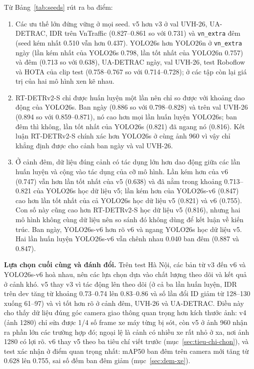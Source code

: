 Từ Bảng~\ref{tab:seeds} rút ra ba điểm:
\begin{enumerate}
  \item Các ưu thế lớn đứng vững ở mọi seed. v5 hơn v3 ở val UVH-26, UA-DETRAC, IDR trên VnTraffic (0.827--0.861 so với
        0.731) và \texttt{vn\_extra} đêm (seed kém nhất 0.510 vẫn hơn 0.437). YOLO26s hơn YOLO26n ở \texttt{vn\_extra}
        ngày (lần kém nhất của YOLO26s 0.798, lần tốt nhất của YOLO26n 0.757) và đêm (0.713 so với 0.638), UA-DETRAC
        ngày, val UVH-26, test Roboflow và HOTA của clip test (0.758--0.767 so với 0.714--0.728); ở các tập còn lại giá
        trị của hai mô hình xen kẽ nhau.
  \item RT-DETRv2-S chỉ được huấn luyện một lần nên chỉ so được với khoảng dao động của YOLO26s. Ban ngày (0.886 so với
        0.798--0.828) và trên val UVH-26 (0.894 so với 0.859--0.871), nó cao hơn mọi lần huấn luyện YOLO26s; ban đêm thì
        không, lần tốt nhất của YOLO26s (0.821) đã ngang nó (0.816). Kết luận RT-DETRv2-S chính xác hơn YOLO26s ở cùng
        ảnh 960 vì vậy chỉ khẳng định được cho cảnh ban ngày và val UVH-26.
  \item Ở cảnh đêm, dữ liệu đúng cảnh có tác dụng lớn hơn dao động giữa các lần huấn luyện và cộng vào tác dụng của cỡ
        mô hình. Lần kém hơn của v6 (0.747) vẫn hơn lần tốt nhất của v5 (0.638) và đã nằm trong khoảng 0.713--0.821 của
        YOLO26s học dữ liệu v5; lần kém hơn của YOLO26s-v6 (0.847) cao hơn lần tốt nhất của cả YOLO26s học dữ liệu v5
        (0.821) và v6 (0.755). Con số này cũng cao hơn RT-DETRv2-S học dữ liệu v5 (0.816), nhưng hai mô hình không cùng
        dữ liệu nên so sánh đó không dùng để kết luận về kiến trúc. Ban ngày, YOLO26s-v6 hơn rõ v6 và ngang YOLO26s học
        dữ liệu v5. Hai lần huấn luyện YOLO26s-v6 vẫn chênh nhau 0.040 ban đêm (0.887 và 0.847).
\end{enumerate}

\textbf{Lựa chọn cuối cùng và đánh đổi.} Trên test Hà Nội, các bản từ v3 đến v6 và YOLO26s-v6 hoà nhau, nên các lựa
chọn dựa vào chất lượng theo dõi và kết quả ở cảnh khó. v5 thay v3 vì tác động lên theo dõi (ở cả ba lần huấn luyện,
IDR trên dev tăng từ khoảng 0.73--0.74 lên 0.83--0.86 và số lần đổi ID giảm từ 128--130 xuống 61--97) và vì tốt hơn rõ
ở cảnh đêm, UVH-26 và UA-DETRAC. Điều này cho thấy dữ liệu đúng góc camera giao thông quan trọng hơn kích thước ảnh: v4
(ảnh 1280) chỉ sửa được 1/4 số frame xe máy từng bị sót, còn v5 ở ảnh 960 nhận ra phần lớn các trường hợp đó; ngoại lệ
là cảnh có nhiều xe rất nhỏ ở xa, nơi ảnh 1280 có lợi rõ. v6 thay v5 theo ba tiêu chí viết trước
(mục~\ref{sec:tieu-chi-chon}), và test xác nhận ở điểm quan trọng nhất: mAP50 ban đêm trên camera mới tăng từ 0.628 lên
0.755, sai số đếm ban đêm giảm (mục~\ref{sec:dem-xe}).

